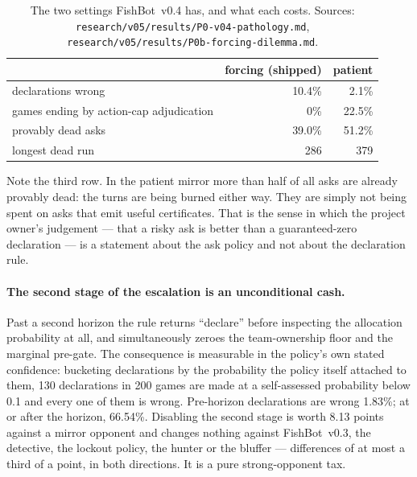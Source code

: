 \documentclass[11pt]{article}
\theoremstyle{definition}
\DeclareRobustCommand{\vfour}{\texorpdfstring{\mbox{FishBot v0.4}}{FishBot v0.4}}
\DeclareRobustCommand{\vthree}{\texorpdfstring{\mbox{FishBot v0.3}}{FishBot v0.3}}
\providecommand{\numDeadAsk}{39.0}
\providecommand{\numDeadRunLongest}{286}
\providecommand{\numDeclWrong}{10.4}
\providecommand{\numPatientCap}{22.5}
\providecommand{\numPatientDeadAsk}{51.2}
\providecommand{\numPatientDeadRun}{379}
\providecommand{\numPatientDeclWrong}{2.1}
\providecommand{\numStageTwoCost}{8.13}
\providecommand{\numPreHorizonWrong}{1.83}
\providecommand{\numHorizonWrong}{66.54}
\providecommand{\numLowConfDecl}{130}
\providecommand{\numLowConfGames}{200}
\providecommand{\numLowConfThresh}{0.1}
\begin{document}
\begin{table}[t]
\centering
\caption{The two settings \vfour{} has, and what each costs. Sources:
\texttt{research/v05/results/P0-v04-pathology.md},
\texttt{research/v05/results/P0b-forcing-dilemma.md}.}
\label{tab:dilemma}
\begin{tabular}{lrr}
\toprule
& \textbf{forcing (shipped)} & \textbf{patient} \\
\midrule
declarations wrong                        & \numDeclWrong\%     & \numPatientDeclWrong\% \\
games ending by action-cap adjudication   & 0\%                 & \numPatientCap\% \\
provably dead asks                        & \numDeadAsk\%       & \numPatientDeadAsk\% \\
longest dead run                          & \numDeadRunLongest{} & \numPatientDeadRun{} \\
\bottomrule
\end{tabular}
\end{table}

Note the third row. In the patient mirror more than half of all asks are already
provably dead: the turns are being burned either way. They are simply not being
spent on asks that emit useful certificates. That is the sense in which the
project owner's judgement --- that a risky ask is better than a guaranteed-zero
declaration --- is a statement about the ask policy and not about the
declaration rule.

\paragraph{The second stage of the escalation is an unconditional cash.} Past a
second horizon the rule returns ``declare'' before inspecting the allocation
probability at all, and simultaneously zeroes the team-ownership floor and the
marginal pre-gate. The consequence is measurable in the policy's own stated
confidence: bucketing declarations by the probability the policy itself attached
to them, \numLowConfDecl{} declarations in \numLowConfGames{} games are made at a
self-assessed probability below \numLowConfThresh{} and every one of them is
wrong. Pre-horizon declarations are wrong
\numPreHorizonWrong\%; at or after the horizon, \numHorizonWrong\%. Disabling the
second stage is worth \numStageTwoCost{} points against a mirror opponent and
changes nothing against \vthree{}, the detective, the lockout policy, the hunter
or the bluffer --- differences of at most a third of a point, in both directions.
It is a pure strong-opponent tax.
\end{document}
